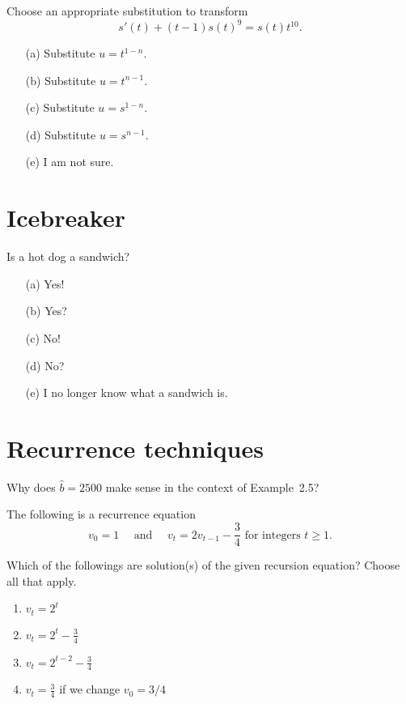 \documentclass[14pt]{beamer}
\begin{document}
\begin{frame}[t]
  Choose an appropriate substitution to transform
  \[
    s'(t) + (t-1)s(t)^{9} = s(t) t^{10}.
  \]

  \begin{itemize} \setlength\itemsep{1ex}
    \item[(a)] Substitute \(u = t^{1-n}\).
    \item[(b)] Substitute \(u = t^{n-1}\).
    \item[(c)] Substitute \(u = s^{1-n}\).
    \item[(d)] Substitute \(u = s^{n-1}\).
    \item[(e)] I am not sure.
  \end{itemize} 
\end{frame}

\section{Icebreaker}

\begin{frame}
  Is a hot dog a sandwich?
  
  \medskip
  \begin{itemize} \setlength\itemsep{2ex}
    \item[(a)] Yes!
    \item[(b)] Yes?
    \item[(c)] No!
    \item[(d)] No?
    \item[(e)] I no longer know what a sandwich is.
  \end{itemize} 
\end{frame}

\section{Recurrence techniques}

\begin{frame}
  Why does \(\hat{b} = 2500\) make sense in the context of Example~2.5?
\end{frame}


\begin{frame}[t]
  The following is a recurrence equation
  \[
    v_{0} = 1 \quad\text{ and }\quad v_{t} = 2 v_{t-1} - \frac{3}{4} \text{ for integers } t \ge 1.
  \]

  Which of the followings are solution(s) of the given recursion equation? Choose all that apply.

  \begin{enumerate}
    \item \(v_{t} = 2^{t}\)
    \item \(v_{t} = 2^{t} - \frac{3}{4}\)
    \item \(v_{t} = 2^{t-2} - \frac{3}{4}\)
    \item \(v_{t} = \frac{3}{4}\) if we change \(v_{0} = 3/4\)
  \end{enumerate}
\end{frame}
\end{document}
